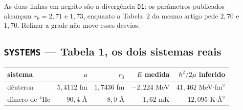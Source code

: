 \documentclass[11pt,a4paper]{article}
\begin{document}
\noindent
As duas linhas em negrito são a divergência \texttt{D1}: os parâmetros
publicados alcançam $r_0 = 2{,}71$ e $1{,}73$, enquanto a Tabela~2 do mesmo
artigo pede $2{,}70$ e $1{,}70$. Refinar a grade não move esses desvios.

\subsection*{\texttt{SYSTEMS} --- Tabela 1, os dois sistemas reais}
\begin{center}
\begin{tabular}{lrrrr}
\toprule
sistema & $a$ & $r_0$ & $E$ medida & $\hbar^2/2\mu$ inferido \\
\midrule
dêuteron & $5{,}4112$ fm & $1{,}7436$ fm & $-2{,}224$ MeV & $41{,}462$ MeV$\cdot$fm$^2$ \\
dímero de $^4$He & $90{,}4$ \AA & $8{,}0$ \AA & $-1{,}62$ mK & $12{,}095$ K$\cdot$\AA$^2$ \\
\bottomrule
\end{tabular}
\end{center}
\end{document}
